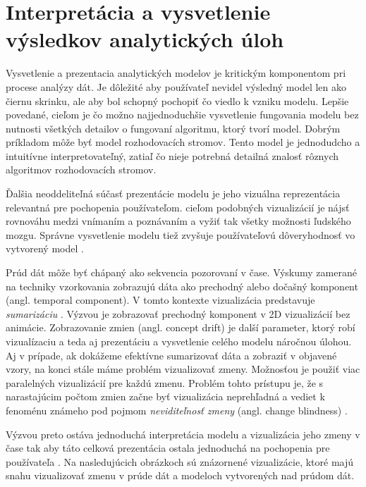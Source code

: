 \chapter{Interpretácia a vysvetlenie výsledkov analytických úloh}
Vysvetlenie a prezentacia analytických modelov je kritickým komponentom pri procese analýzy dát. Je dôležité aby používateľ nevidel výsledný model len ako čiernu skrinku, ale aby bol schopný pochopiť čo viedlo k vzniku modelu. Lepšie povedané, cieľom je čo možno najjednoduchšie vysvetlenie fungovania modelu bez nutnosti všetkých detailov o fungovaní algoritmu, ktorý tvorí model. Dobrým príkladom môže byť model rozhodovacích stromov. Tento model je jednodudcho a intuitívne interpretovateľný, zatiaľ čo nieje potrebná detailná znalosť rôznych algoritmov rozhodovacích stromov.
\par
Ďalšia neoddeliteľná súčasť prezentácie modelu je jeho vizuálna reprezentácia relevantná pre pochopenia používateľom. cieľom podobných vizualizácií je nájsť rovnováhu medzi vnímaním a poznávaním a vyžiť tak všetky možnosti ľudského mozgu. Správne vysvetlenie modelu tiež zvyšuje používateľovú dôveryhodnosť vo vytvorený model \citep{Demsar2014, Barlow2001}. 
\par
Prúd dát môže byť chápaný ako sekvencia pozorovaní v čase. Výskumy zamerané na techniky vzorkovania zobrazujú dáta ako prechodný alebo dočašný komponent (angl. temporal component). V tomto kontexte vizualizácia predstavuje \textit{sumarizáciu} \citep{Demsar2014}. Výzvou je zobrazovať prechodný komponent v 2D vizualizácií bez animácie. Zobrazovanie zmien (angl. concept drift) je další parameter, ktorý robí vizualízaciu a teda aj prezentáciu a vysvetlenie celého modelu náročnou úlohou. Aj v prípade, ak dokážeme efektívne sumarizovať dáta a zobraziť v objavené vzory, na konci stále máme problém vizualizovať zmeny. Možnosťou je použiť viac paralelných vizualizácií pre každú zmenu. Problém tohto prístupu je, že s narastajúcim počtom zmien začne byť vizualizácia neprehľadná a vediet k fenoménu známeho pod pojmom \textit{neviditeľnosť zmeny} (angl. change blindness) \citep{Demsar2014}.
\par
Výzvou preto ostáva jednoduchá interpretácia modelu a vizualizácia jeho zmeny v čase tak aby táto celková prezentácia ostala jednoduchá na pochopenia pre používateľa \citep{Demsar2014, Yao2013}. Na nasledujúcich obrázkoch sú znázornené vizualizácie, ktoré majú snahu vizualizovať zmenu v prúde dát a modeloch vytvorených nad prúdom dát.
\label{fig:vis-concept-distribution}

